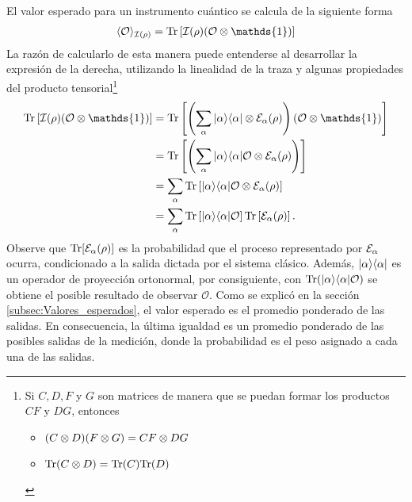 
El valor esperado para un instrumento cuántico se calcula de la siguiente forma\begin{equation}\label{eq:expected-value-quantum-instrument}\begin{split}
    \la\mathcal{O}\ra_{\mathcal{I}(\rho)}&=\tr\left[\mathcal{I}(\rho)(\mathcal{O}\tensor\mathds{1})\right]\\
\end{split}
\end{equation} La razón de calcularlo de esta manera puede entenderse al desarrollar la expresión de la derecha, utilizando la linealidad de la traza y algunas propiedades del producto tensorial\footnote{Si $C, D, F$ y $G$ son matrices de manera que se puedan formar los productos $CF$ y $DG$, entonces\begin{itemize}\item $(C\otimes D)(F\otimes G)=CF\otimes DG$ \item ${\rm Tr}(C\otimes D)={\rm Tr}(C){\rm Tr}(D)$\end{itemize}}\[\begin{split}
   \tr\left[\mathcal{I}(\rho)(\mathcal{O}\tensor\mathds{1})\right]&=\tr\left[\left(\sum_\alpha |\alpha\rala\alpha|\otimes \E_\alpha(\rho)\right)(\mathcal{O}\tensor\mathds{1})\right]\\
   &=\tr\left[\left(\sum_\alpha |\alpha\rala\alpha|\mathcal{O}\otimes \E_\alpha(\rho)\right)\right]\\
   &=\sum_\alpha\tr\left[|\alpha\rala\alpha|\mathcal{O}\otimes \E_\alpha(\rho)\right]\\
   &=\sum_\alpha\tr\left[|\alpha\rala\alpha|\mathcal{O}\right]\tr\left[\E_\alpha(\rho)\right].
\end{split}\] Observe que ${\rm Tr}[\mathcal{E}_\alpha(\rho)]$ es la probabilidad que el proceso representado por $\mathcal{E}_\alpha$ ocurra, condicionado a la salida dictada por el sistema clásico.  Además, $|\alpha\rangle \langle \alpha|$ es un operador de proyección ortonormal, por consiguiente, con ${\rm Tr}(|\alpha\rangle \langle\alpha|\mathcal{O})$ se obtiene el posible resultado de observar $\mathcal{O}$. Como se explicó en la sección  {\ref{subsec:Valores_esperados}}, el valor esperado es el promedio ponderado de las salidas. En consecuencia, la última igualdad es un promedio ponderado de las posibles salidas de la medición, donde la probabilidad es el peso asignado a cada una de las salidas.




